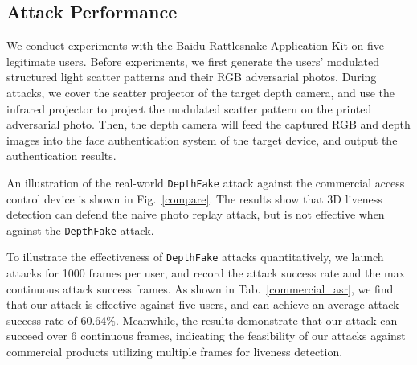 
\subsection{Attack Performance}
We conduct experiments with the Baidu Rattlesnake Application Kit on five legitimate users.
Before experiments, we first generate the users' modulated structured light scatter patterns and their RGB adversarial photos.
During attacks, we cover the scatter projector of the target depth camera, and use the infrared projector to project the modulated scatter pattern on the printed adversarial photo. Then, the depth camera will feed the captured RGB and depth images into the face authentication system of the target device, and  output the authentication results.

An illustration of the real-world \texttt{DepthFake} attack against the commercial access control device is shown in Fig.~\ref{compare}. The results show that 3D liveness detection can defend the naive photo replay attack, but is not effective when against the \texttt{DepthFake} attack. 

To illustrate the effectiveness of \texttt{DepthFake} attacks quantitatively, we launch attacks for 1000 frames per user, and record the attack success rate and the max continuous attack success frames.
As shown in Tab.~\ref{commercial_asr}, we find that our attack is effective against five users, and can achieve an average attack success rate of $60.64\%$. 
Meanwhile, the results demonstrate that our attack can succeed over 6 continuous frames, indicating the feasibility of our attacks against  commercial products utilizing multiple frames for liveness detection.

